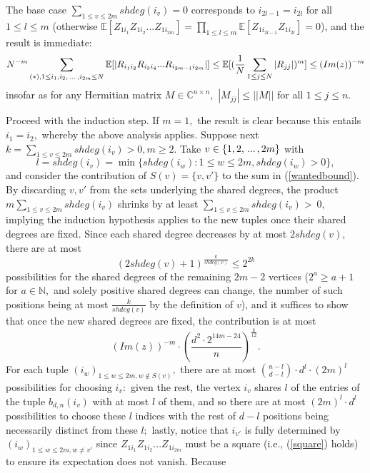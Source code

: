 \documentclass{article}
\numberwithin{equation}{section}
\begin{document}
\par
The base case \(\sum_{1 \leq v \leq 2m}{shdeg(i_v)}=0\) corresponds to \(i_{2l-1}=i_{2l}\) for all \(1 \leq l \leq m\) (otherwise \(\mathbb{E}[Z_{1i_1}Z_{1i_2}...Z_{1i_{2m}}]=\prod_{1 \leq l \leq m}{\mathbb{E}[Z_{1i_{2l-1}}Z_{1i_{2l}}]}=0\)), and the result is immediate:
\[N^{-m}\sum_{(*),1 \leq i_1,i_2,\hspace{0.05cm}...\hspace{0.05cm},i_{2m} \leq N}{\mathbb{E}[|R_{i_1i_2}R_{i_3i_4}...R_{i_{2m-1}i_{2m}}|]} \leq \mathbb{E}[(\frac{1}{N}\sum_{1 \leq j \leq N}{|R_{jj}|})^m] \leq (Im(z))^{-m}\]
insofar as for any Hermitian matrix \(M \in \mathbb{C}^{n \times n},\) \(|M_{jj}| \leq ||M||\) for all \(1 \leq j \leq n.\)
\par
Proceed with the induction step. If \(m=1,\) the result is clear because this entails \(i_1=i_2,\) whereby the above analysis applies. Suppose next \(k=\sum_{1 \leq v \leq 2m}{shdeg(i_v)}>0, m \geq 2.\) Take \(v \in \{1,2,\hspace{0.05cm}...\hspace{0.05cm},2m\}\) with
\[l=shdeg(i_v)=\min{\{shdeg(i_w): 1 \leq w \leq 2m, shdeg(i_w)>0\}},\] 
and consider the contribution of \(S(v)=\{v,v'\}\) to the sum in (\ref{wantedbound}). By discarding \(v,v'\) from the sets underlying the shared degrees, the product \(m\sum_{1 \leq v \leq 2m}{shdeg(i_v)}\) shrinks by at least \(\sum_{1 \leq v \leq 2m}{shdeg(i_v)}>~0,\) implying the induction hypothesis applies to the new tuples once their shared degrees are fixed. Since 
each shared degree decreases by at most \(2shdeg(v),\) there are at most
\[(2shdeg(v)+1)^{\frac{k}{shdeg(v)}} \leq 2^{2k}\] 
possibilities for the shared degrees of the remaining \(2m-2\) vertices (\(2^a \geq a+1\) for \(a \in \mathbb{N},\) and solely positive shared degrees can change, the number of such positions being at most \(\frac{k}{shdeg(v)}\) by the definition of \(v\)), and it suffices to show that once the new shared degrees are fixed, the contribution is at most
\[(Im(z))^{-m} \cdot (\frac{d^2 \cdot 2^{14m-24}}{n})^{\frac{k}{12}}.\]
For each tuple \((i_w)_{1 \leq w \leq 2m, w \not \in S(v)},\) there are at most \(\binom{n-l}{d-l} \cdot d^l \cdot (2m)^l\) possibilities for choosing \(i_v:\) given the rest, the vertex \(i_v\) shares \(l\) of the entries of the tuple \(b_{d,n}(i_v)\) with at most \(l\) of them, and so there are at most \((2m)^l \cdot d^l\) possibilities to choose these \(l\) indices with the rest of \(d-l\) positions being necessarily distinct from these \(l;\) lastly, notice that \(i_{v'}\) is fully determined by \((i_w)_{1 \leq w \leq 2m, w \ne v'}\) since \(Z_{1i_1}Z_{1i_2}...Z_{1i_{2m}}\) must be a square (i.e., (\ref{square}) holds) to ensure its expectation does not vanish. Because
\end{document}
